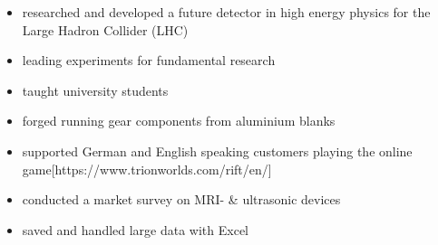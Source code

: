 
\begin{itemize}
	\item researched and developed a future detector in high energy physics for the Large Hadron Collider (LHC)
	\item leading experiments for fundamental research
	\item taught university students
\end{itemize}

\divider

\begin{itemize}
	\item forged running gear components from aluminium blanks
\end{itemize}

\divider

\begin{itemize}
	\item supported German and English speaking customers playing the online game[https://www.trionworlds.com/rift/en/]
\end{itemize}

\divider

\begin{itemize}
	\item conducted a market survey on MRI- \& ultrasonic devices
	\item saved and handled large data with Excel 
\end{itemize}
